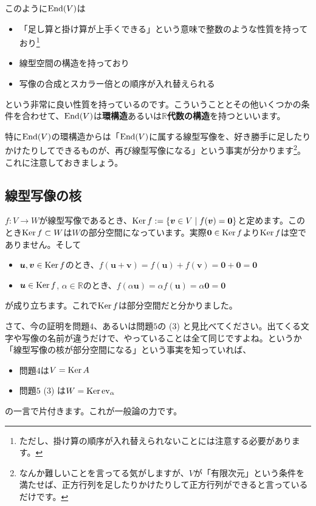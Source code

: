 このように$\operatorname{End}(V)$は
\begin{itemize}
\item 「足し算と掛け算が上手くできる」という意味で整数のような性質を持っており\footnote{ただし、掛け算の順序が入れ替えられないことには注意する必要があります。}
\item 線型空間の構造を持っており
\item 写像の合成とスカラー倍との順序が入れ替えられる
\end{itemize}
という非常に良い性質を持っているのです。こういうこととその他いくつかの条件を合わせて、$\operatorname{End}(V)$は\textbf{環構造}あるいは\textbf{$\mathbb{R}$代数の構造}を持つといいます。

特に$\operatorname{End}(V)$の環構造からは「$\operatorname{End}(V)$に属する線型写像を、好き勝手に足したりかけたりしてできるものが、再び線型写像になる」という事実が分かります\footnote{なんか難しいことを言ってる気がしますが、$V$が「有限次元」という条件を満たせば、正方行列を足したりかけたりして正方行列ができると言っているだけです。}。これに注意しておきましょう。

\subsection{線型写像の核} \label{subsec:kernel}

$f\colon V\rightarrow W$が線型写像であるとき、$\operatorname{Ker} f:=\{\boldsymbol{v} \in V \mid f(\boldsymbol{v}) = \boldsymbol{0}\}$と定めます。このとき$\operatorname{Ker} f\subset W$は$W$の部分空間になっています。実際$\boldsymbol{0} \in \operatorname{Ker} f$より$\operatorname{Ker} f$は空でありません。そして
\begin{itemize}
\item $\boldsymbol{u}, \boldsymbol{v}\in \operatorname{Ker} f$のとき、$f(\bm{u} + \bm{v}) = f(\bm{u}) + f(\bm{v}) = \bm{0} + \bm{0} = \bm{0}$
\item $\boldsymbol{u} \in \operatorname{Ker} f$, $\alpha\in\mathbb{R}$のとき、$f(\alpha\bm{u}) = \alpha f(\bm{u}) = \alpha \bm{0} = \bm{0}$
\end{itemize}
が成り立ちます。これで$\operatorname{Ker} f$は部分空間だと分かりました。

さて、今の証明を問題$4$、あるいは問題$5$の (3) と見比べてください。出てくる文字や写像の名前が違うだけで、やっていることは全て同じですよね。というか「線型写像の核が部分空間になる」という事実を知っていれば、
\begin{itemize}
\item 問題$4$は$V = \operatorname{Ker} A$
\item 問題$5$ (3) は$W = \operatorname{Ker} \operatorname{ev}_{\alpha}$
\end{itemize}
の一言で片付きます。これが一般論の力です。

